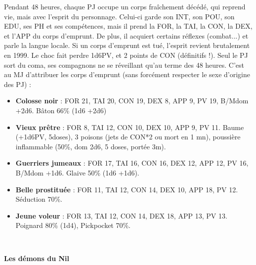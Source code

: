 \documentclass[11pt,twoside,a4paper]{book}
\begin{document}
Pendant 48 heures, chaque PJ occupe un corps fra{\^i}chement d{\'e}c{\'e}d{\'e}, qui reprend vie, mais avec l'esprit du personnage. Celui-ci garde son INT, son POU, son EDU, ses PH et ses comp{\'e}tences, mais il prend la FOR, la TAI, la CON, la DEX, et l'APP du corps d'emprunt. De plus, il acquiert certains r{\'e}flexes (combat...) et parle la langue locale. Si un corps d'emprunt est tu{\'e}, l'esprit revient brutalement en 1999. Le choc fait perdre 1d6PV, et 2 points de CON (d{\'e}finitifs !). Seul le PJ sort du coma, ses compagnons ne se r{\'e}veillant qu'au terme des 48 heures. C'est au MJ d'attribuer les corps d'emprunt (sans forc{\'e}ment respecter le sexe d'origine des PJ) :
\setlength\parindent{20pt}
\begin{itemize}
	\item \textbf{Colosse noir} : FOR 21, TAI 20, CON 19, DEX 8, APP 9, PV 19, B/Mdom +2d6. B{\^a}ton 66\% (1d6 +2d6)
	\item \textbf{Vieux pr{\^e}tre} : FOR 8, TAI 12, CON 10, DEX 10, APP 9, PV 11. Baume (+1d6PV, 5doses), 3 poisons (jets de CON*2 ou mort en 1 mn), poussi{\`e}re inflammable (50\%, dom 2d6, 5 doses, port{\'e}e 3m).
	\item \textbf{Guerriers jumeaux} : FOR 17, TAI 16, CON 16, DEX 12, APP 12, PV 16, B/Mdom +1d6. Glaive 50\% (1d6 +1d6).
	\item \textbf{Belle prostitu{\'e}e} : FOR 11, TAI 12, CON 14, DEX 10, APP 18, PV 12. S{\'e}duction 70\%.
	\item \textbf{Jeune voleur} : FOR 13, TAI 12, CON 14, DEX 18, APP 13, PV 13. Poignard 80\% (1d4), Pickpocket 70\%.
\end{itemize}~\\
\setlength\parindent{0pt}

\textbf{\large Les d{\'e}mons du Nil}~\\
\end{document}
